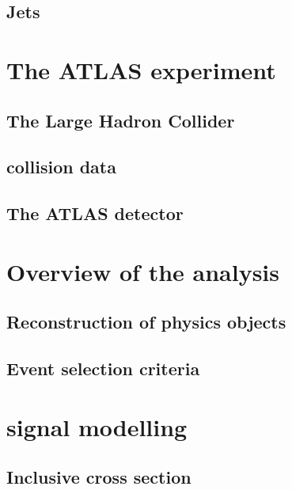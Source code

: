 \documentclass[hyper,linkcolor=blue]{mythesis}
\begin{document}
\begin{mainmatter}
    \section{Jets}
      \label{sec:jets}
      

  \chapter{The ATLAS experiment}
    \label{chap:experiment}
    
    \section{The Large Hadron Collider}
      \label{sec:lhc}
      
    \section{\pp collision data}
      \label{sec:dataset}
      
    \section{The ATLAS detector}
      \label{sec:atlas}
      
  
  \chapter{Overview of the \HWW analysis}
    \label{chap:selection}
    
    \section{Reconstruction of physics objects}
      \label{sec:objects}
      
    \section{Event selection criteria}
      \label{sec:selection}
      

  \chapter{\ggH signal modelling}
    \label{chap:signal}
    
    \section{Inclusive cross section}
      \label{sec:ggf_inc}
      

\end{mainmatter}
\end{document}
